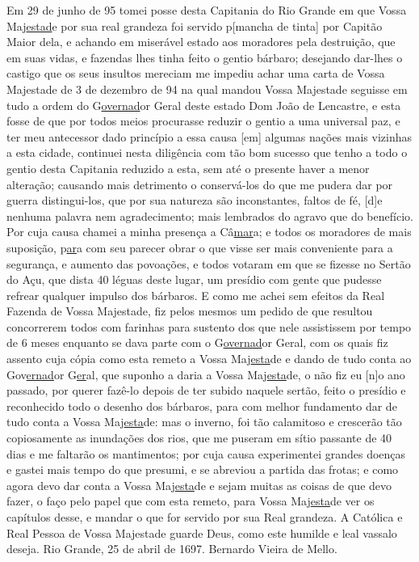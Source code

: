 \begin{refsection}
    Em 29 de junho de 95 tomei posse desta Capitania do Rio Grande em que Vossa Maj\underline{estad}e por sua real grandeza foi servido p[mancha de tinta] por Capitão Maior dela, e achando em miserável estado aos moradores pela destruição, que em suas vidas, e fazendas lhes tinha feito o gentio bárbaro; desejando dar-lhes o castigo que os seus insultos mereciam me impediu achar uma carta de Vossa Majestade de 3 de dezembro de 94 na qual mandou Vossa Majestade seguisse em tudo a ordem do G\underline{overnad}or Geral deste estado Dom João de Lencastre, e esta fosse de que por todos meios procurasse reduzir o gentio a uma universal paz, e ter meu antecessor dado princípio a essa causa [em] algumas nações mais vizinhas a esta cidade, continuei nesta diligência com tão bom sucesso que tenho a todo o gentio desta Capitania reduzido a esta, sem até o presente haver a menor alteração; causando mais detrimento o conservá-los do que me pudera dar por guerra distingui-los, que por sua natureza são inconstantes, faltos de fé, [d]e nenhuma palavra nem agradecimento; mais lembrados do agravo que do benefício. Por cuja causa chamei a minha presença a Câ\underline{mar}a; e todos os moradores de mais suposição, p\underline{ar}a com seu parecer obrar o que visse ser mais conveniente para a segurança, e aumento das povoações, e todos votaram em que se fizesse no Sertão do Açu, que dista 40 léguas deste lugar, um presídio com gente que pudesse refrear qualquer impulso dos bárbaros. E como me achei sem efeitos da Real Fazenda de Vossa Majestade, fiz pelos mesmos um pedido de que resultou concorrerem todos com farinhas para sustento dos que nele assistissem por tempo de 6 meses enquanto se dava parte com o G\underline{overnad}or Geral, com os quais fiz assento cuja cópia como esta remeto a Vossa Maj\underline{esta}de e dando de tudo conta ao Gov\underline{ernad}or G\underline{er}al, que suponho a daria a Vossa Maj\underline{esta}de, o não fiz eu [n]o ano passado, por querer fazê-lo depois de ter subido naquele sertão, feito o presídio e reconhecido todo o desenho dos bárbaros, para com melhor fundamento dar de tudo conta a Vossa Maj\underline{esta}de: mas o inverno, foi tão calamitoso e crescerão tão copiosamente as inundações dos rios, que me puseram em sítio passante de 40 dias e me faltarão os mantimentos; por cuja causa experimentei grandes doenças e gastei mais tempo do que presumi, e se abreviou a partida das frotas; e como agora devo dar conta a Vossa Maj\underline{esta}de e sejam muitas as coisas de que devo fazer, o faço pelo papel que com esta remeto, para Vossa Maj\underline{esta}de ver os capítulos desse, e mandar o que for servido por sua Real grandeza. A Católica e Real Pessoa de Vossa Majestade guarde Deus, como este humilde e leal vassalo deseja. Rio Grande, 25 de abril de 1697. Bernardo Vieira de Mello. 


\end{refsection}
